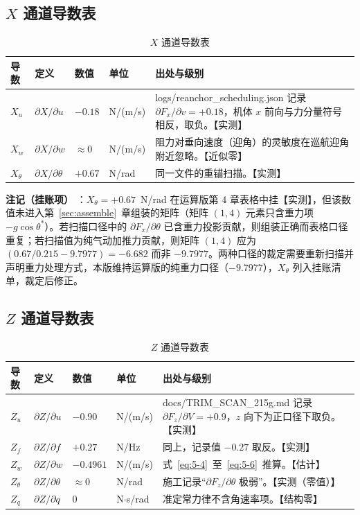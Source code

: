 \documentclass[11pt,a4paper]{ctexart}
\begin{document}
\subsection{\texorpdfstring{$X$}{X} 通道导数表}

\begin{table}[htbp]
\centering\small
\begin{tabularx}{\textwidth}{llllX}
\toprule
导数 & 定义 & 数值 & 单位 & 出处与级别 \\
\midrule
$X_u$ & $\partial X/\partial u$ & $-0.18$ & N/(m/s) & logs/reanchor\_scheduling.json 记录 $\partial F_x/\partial v=+0.18$，机体 $x$ 前向与力分量符号相反，取负。【实测】 \\
$X_w$ & $\partial X/\partial w$ & $\approx 0$ & N/(m/s) & 阻力对垂向速度（迎角）的灵敏度在巡航迎角附近忽略。【近似零】 \\
$X_\theta$ & $\partial X/\partial\theta$ & $+0.67$ & N/rad & 同一文件的重锚扫描。【实测】 \\
\bottomrule
\end{tabularx}
\caption{$X$ 通道导数表}
\end{table}

\begin{notebox}
\textbf{注记（挂账项） }：$X_\theta=+0.67$~N/rad 在运算版第 4 章表格中挂【实测】，但该数值未进入第~\ref{sec:assemble}~章组装的矩阵（矩阵 $(1,4)$ 元素只含重力项 $-g\cos\theta^{*}$）。若扫描口径中的 $\partial F_x/\partial\theta$ 已含重力投影贡献，则组装正确而表格口径重复；若扫描值为纯气动加推力贡献，则矩阵 $(1,4)$ 应为 $(0.67/0.215-9.7977)=-6.682$ 而非 $-9.7977$。两种口径的裁定需要重新扫描并声明重力处理方式，本版维持运算版的纯重力口径（$-9.7977$），$X_\theta$ 列入挂账清单，裁定后修正。
\end{notebox}

\subsection{\texorpdfstring{$Z$}{Z} 通道导数表}

\begin{table}[htbp]
\centering\small
\begin{tabularx}{\textwidth}{llllX}
\toprule
导数 & 定义 & 数值 & 单位 & 出处与级别 \\
\midrule
$Z_u$ & $\partial Z/\partial u$ & $-0.90$ & N/(m/s) & docs/TRIM\_SCAN\_215g.md 记录 $\partial F_z/\partial V=+0.9$，$z$ 向下为正口径下取负。【实测】 \\
$Z_f$ & $\partial Z/\partial f$ & $+0.27$ & N/Hz & 同上，记录值 $-0.27$ 取反。【实测】 \\
$Z_w$ & $\partial Z/\partial w$ & $-0.4961$ & N/(m/s) & 式~\eqref{eq:5-4}~至~\eqref{eq:5-6}~推算。【估计】 \\
$Z_\theta$ & $\partial Z/\partial\theta$ & $\approx 0$ & N/rad & 施工记录“$\partial F_z/\partial\theta$ 极弱”。【实测（零值）】 \\
$Z_q$ & $\partial Z/\partial q$ & $0$ & N$\cdot$s/rad & 准定常力律不含角速率项。【结构零】 \\
\bottomrule
\end{tabularx}
\caption{$Z$ 通道导数表}
\end{table}
\end{document}

